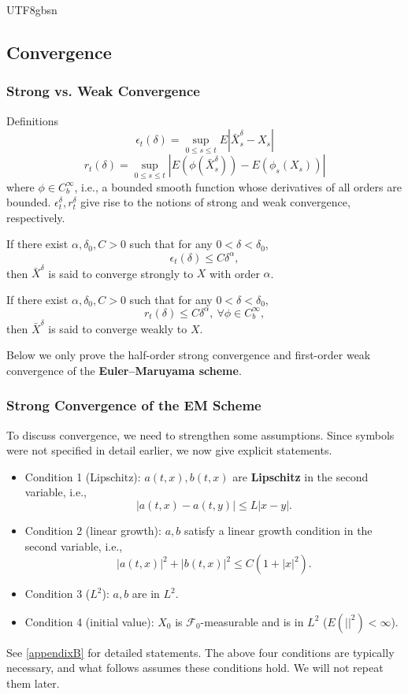 \documentclass{article}
\begin{document}
\begin{CJK*}{UTF8}{gbsn}
\subsection{Convergence}
\subsubsection{Strong vs. Weak Convergence}
Definitions
$$
\epsilon_{t}(\delta)=\sup_{0\leq s\leq t}E|\bar{X}_{s}^{\delta}-X_{s}|
$$
$$
r_{t}(\delta)=\sup_{0\le s\le t}\left|E(\phi(\bar{X}_{s}^{\delta}))-E(\phi_{s}({X}_{s}))\right|
$$
where $\phi\in C_b^\infty$, i.e., a bounded smooth function whose derivatives of all orders are bounded. $\epsilon_{t}^{\delta}, r_{t}^{\delta}$ give rise to the notions of strong and weak convergence, respectively.
\begin{definition}
    If there exist $\alpha,\delta_0,C>0$ such that for any $0<\delta<\delta_0$,
    $$
    \epsilon_{t}(\delta)\le C\delta^\alpha,
    $$
    then $\bar{X}^\delta$ is said to converge strongly to $X$ with order $\alpha$.
\end{definition}

\begin{definition}
    If there exist $\alpha,\delta_0,C>0$ such that for any $0<\delta<\delta_0$,
    $$
    r_{t}(\delta)\le C\delta^\alpha,\ \forall\phi\in C_b^\infty,
    $$
    then $\bar{X}^\delta$ is said to converge weakly to $X$.
\end{definition}
Below we only prove the half-order strong convergence and first-order weak convergence of the \textbf{Euler–Maruyama scheme}.

\subsubsection{Strong Convergence of the EM Scheme}
To discuss convergence, we need to strengthen some assumptions. Since symbols were not specified in detail earlier, we now give explicit statements.
\begin{itemize}\label{conditions}
    \item Condition 1 (Lipschitz): $a(t,x),b(t,x)$ are \textbf{Lipschitz} in the second variable, i.e.,
    $$|a(t,x)-a(t,y)|\le L|x-y|.$$
    \item Condition 2 (linear growth): $a,b$ satisfy a linear growth condition in the second variable, i.e.,
    $$|a(t,x)|^2+|b(t,x)|^2\le C(1+|x|^2).$$
    \item Condition 3 ($L^2$): $a,b$ are in $L^2$.
    \item Condition 4 (initial value): $X_0$ is $\mathcal{F}_0$-measurable and is in $L^2$ ($E(||^2)<\infty$).
\end{itemize}
See \ref{appendixB} for detailed statements. The above four conditions are typically necessary, and what follows assumes these conditions hold. We will not repeat them later.


\end{CJK*}
\end{document}
